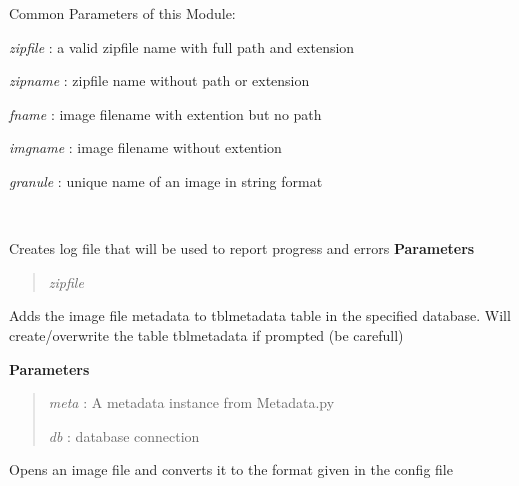 \documentclass[letterpaper,10pt,openany,oneside]{sphinxmanual}
\begin{document}
Common Parameters of this Module:

\emph{zipfile} : a valid zipfile name with full path and extension

\emph{zipname} : zipfile name without path or extension

\emph{fname} : image filename with extention but no path

\emph{imgname} : image filename without extention

\emph{granule} : unique name of an image in string format

\begin{fulllineitems}
\label{code:SigLib.SigLib}~

\begin{fulllineitems}
\label{code:SigLib.SigLib.createLog}
Creates log file that will be used to report progress and errors
\textbf{Parameters}
\begin{quote}

\emph{zipfile}
\end{quote}

\end{fulllineitems}


\begin{fulllineitems}
\label{code:SigLib.SigLib.data2db}
Adds the image file metadata to tblmetadata table in the specified database.
Will create/overwrite the table tblmetadata if prompted (be carefull)

\textbf{Parameters}
\begin{quote}

\emph{meta} :   A metadata instance from Metadata.py

\emph{db}   :   database connection
\end{quote}

\end{fulllineitems}


\begin{fulllineitems}
\label{code:SigLib.SigLib.data2img}
Opens an image file and converts it to the format given in the config file


\end{fulllineitems}
\end{fulllineitems}
\end{document}
